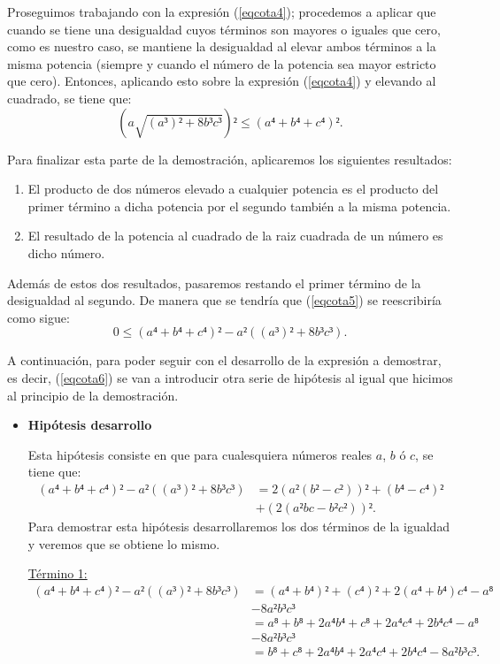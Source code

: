 \begin{demostracion}
  Proseguimos trabajando con la expresión (\ref{eqcota4}); procedemos a
  aplicar que cuando se tiene una desigualdad cuyos términos son mayores
  o iguales que cero, como es nuestro caso, se mantiene la desigualdad al
  elevar ambos términos a la misma potencia (siempre y cuando el número de
  la potencia sea mayor estricto que cero). Entonces, aplicando esto sobre
  la expresión (\ref{eqcota4}) y elevando al cuadrado, se tiene que:
  \begin{equation}\label{eqcota5}
    (a \sqrt{(a³)²+8b³c³})²≤(a⁴+b⁴+c⁴)².
  \end{equation}

  Para finalizar esta parte de la demostración, aplicaremos los siguientes
  resultados:
  \begin{enumerate}
  \item El producto de dos números elevado a cualquier potencia es el
    producto del primer término a dicha potencia por el segundo también a la
    misma potencia.
  \item El resultado de la potencia al cuadrado de la raiz cuadrada de un
    número es dicho número.
  \end{enumerate}
  Además de estos dos resultados, pasaremos restando el primer término de la
  desigualdad al segundo. De manera que se tendría que (\ref{eqcota5}) se
  reescribiría como sigue:
  \begin{equation}\label{eqcota6}
    0≤ (a⁴+b⁴+c⁴)²-a²((a³)²+8b³c³).
  \end{equation}

  A continuación, para poder seguir con el desarrollo de la expresión a
  demostrar, es decir, (\ref{eqcota6}) se van a introducir otra serie de
  hipótesis al igual que hicimos al principio de la demostración.
  \begin{itemize}
  \item \textbf{Hipótesis desarrollo}

    Esta hipótesis consiste en que para cualesquiera números reales \(a\),
    \(b\) ó \(c\), se tiene que:
    \begin{align*}\label{desarrollo}\tag{desarrollo}
      (a⁴+b⁴+c⁴)²-a²((a³)²+8b³c³)&=2(a²(b²-c²))²+(b⁴-c⁴)²\\
      &+(2(a²bc-b²c²))².
    \end{align*}
    Para demostrar esta hipótesis desarrollaremos los dos términos de la
    igualdad y veremos que se obtiene lo mismo.

    \underline{Término 1:}
    \begin{align*}
      (a⁴+b⁴+c⁴)²-a²((a³)²+8b³c³)&=(a⁴+b⁴)²+(c⁴)²+2(a⁴+b⁴)c⁴-a⁸\\
      &-8a²b³c³\\
                                 &=a⁸+b⁸+2a⁴b⁴+c⁸+2a⁴c⁴+2b⁴c⁴-a⁸\\
                                   &-8a²b³c³\\
      &=b⁸+c⁸+2a⁴b⁴+2a⁴c⁴+2b⁴c⁴-8a²b³c³.
    \end{align*}


\end{itemize}
\end{demostracion}
